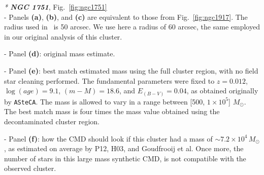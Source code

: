 \documentclass{article}
\begin{document}

\noindent \emph{* \textbf{NGC 1751}}, Fig.~\ref{fig:ngc1751}\\

\noindent - Panels \textbf{(a)}, \textbf{(b)}, and \textbf{(c)} are equivalent
to those from Fig.~\ref{fig:ngc1917}.
The radius used in~\cite{Goudfrooij_2014} is 50 arcsec. We use here a radius of
60 arcsec, the same employed in our original analysis of this cluster.

\noindent - Panel \textbf{(d)}: original mass estimate.

\noindent - Panel \textbf{(e)}: best match estimated mass using the full cluster
region, with no field star cleaning performed. The fundamental
parameters were fixed to $z{=}0.012$, $\log(age){=}9.1$, $(m-M){=}18.6$,
and $E_{(B-V)}{=}0.04$, as obtained originally by \texttt{ASteCA}. The mass is
allowed to vary in a range between [500, $1{\times}10^5$] $M_{\odot}$. The best
match mass is four times the mass value obtained using the decontaminated
cluster region.

\noindent - Panel \textbf{(f)}: how the CMD should look if
this cluster had a mass of ${\sim}7.2{\times}10^4\,M_{\odot}$, as estimated on
average by P12, H03, and Goudfrooij et al.
Once more, the number of stars in this large mass synthetic CMD, is
not compatible with the observed cluster.\\

%
%

\end{document}
